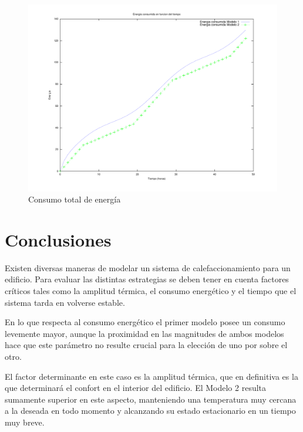 \documentclass{sig-alternate}
\begin{document}
\begin{figure}[hp]
\label{consumo_energia_total}
\centering
\includegraphics[scale=.8]{graficos/energiatotal}
\caption{Consumo total de energ\'{i}a}
\end{figure}


\section{Conclusiones}\label{conclusiones}

Existen diversas maneras de modelar un sistema de calefaccionamiento para un
edificio. Para evaluar las distintas estrategias se deben tener en cuenta
factores cr\'{i}ticos tales como la amplitud t\'{e}rmica, el consumo
energ\'{e}tico y el tiempo que el sistema tarda en volverse estable.

En lo que respecta al consumo energ\'{e}tico el primer mo\-de\-lo posee un consumo
levemente mayor, aunque la pro\-xi\-mi\-dad en las magnitudes de ambos modelos
hace que este par\'{a}metro no resulte crucial para la elecci\'{o}n de uno por sobre
el otro.

El factor determinante en este caso es la amplitud t\'{e}rmica, que en definitiva
es la que determinar\'{a} el confort en el interior del edificio. El Modelo 2
resulta sumamente superior en este aspecto, manteniendo una temperatura muy
cercana a la deseada en todo momento y alcanzando su estado estacionario
en un tiempo muy breve.
\end{document}
